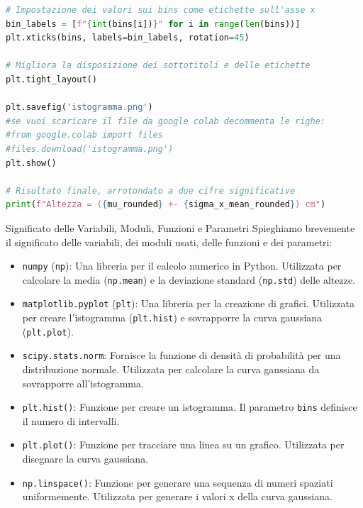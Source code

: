 \documentclass[12pt,a4paper,oneside]{book}
\makeatletter
\renewcommand{\subsection}{\@startsection {subsection}{2}{\z@}
{-3ex \@plus -0.1ex \@minus -.4ex}
{0.5ex \@plus.2ex }
{\color[rgb]{0.141,0.596,0.749}\normalfont\sffamily\bfseries}}
\theoremstyle{esercizio}
\makeatother
\begin{document}
\begin{lstlisting}[language=Python, caption={Script Python per calcolare e visualizzare le altezze}]
# Impostazione dei valori sui bins come etichette sull'asse x
bin_labels = [f"{int(bins[i])}" for i in range(len(bins))]
plt.xticks(bins, labels=bin_labels, rotation=45)

# Migliora la disposizione dei sottotitoli e delle etichette
plt.tight_layout()

plt.savefig('istogramma.png')
#se vuoi scaricare il file da google colab decommenta le righe:
#from google.colab import files
#files.download('istogramma.png')
plt.show()

# Risultato finale, arrotondato a due cifre significative
print(f"Altezza = ({mu_rounded} +- {sigma_x_mean_rounded}) cm")
\end{lstlisting}

\subsection{Significato delle Variabili, Moduli, Funzioni e Parametri}
Spieghiamo brevemente il significato delle variabili, dei moduli usati, delle funzioni e dei parametri:

\begin{itemize}
    \item \texttt{numpy} (\texttt{np}): Una libreria per il calcolo numerico in Python. Utilizzata per calcolare la media (\texttt{np.mean}) e la deviazione standard (\texttt{np.std}) delle altezze.
    \item \texttt{matplotlib.pyplot} (\texttt{plt}): Una libreria per la creazione di grafici. Utilizzata per creare l'istogramma (\texttt{plt.hist}) e sovrapporre la curva gaussiana (\texttt{plt.plot}).
    \item \texttt{scipy.stats.norm}: Fornisce la funzione di densità di probabilità per una distribuzione normale. Utilizzata per calcolare la curva gaussiana da sovrapporre all'istogramma.
    \item \texttt{plt.hist()}: Funzione per creare un istogramma. Il parametro \texttt{bins} definisce il numero di intervalli.
    \item \texttt{plt.plot()}: Funzione per tracciare una linea su un grafico. Utilizzata per disegnare la curva gaussiana.
    \item \texttt{np.linspace()}: Funzione per generare una sequenza di numeri spaziati uniformemente. Utilizzata per generare i valori x della curva gaussiana.
\end{itemize}
\end{document}
